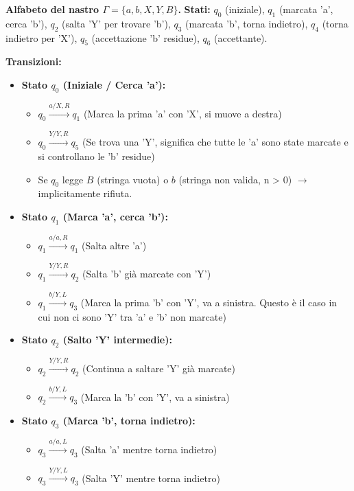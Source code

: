 \documentclass[a4paper, 11pt]{book} %
\theoremstyle{definition}
\begin{document}
\noindent \textbf{Alfabeto del nastro $\Gamma = \{a, b, X, Y, B\}$.}
\noindent \textbf{Stati:} $q_0$ (iniziale), $q_1$ (marcata 'a', cerca 'b'), $q_2$ (salta 'Y' per trovare 'b'), $q_3$ (marcata 'b', torna indietro), $q_4$ (torna indietro per 'X'), $q_5$ (accettazione 'b' residue), $q_6$ (accettante).

\noindent \textbf{Transizioni:}
\begin{itemize}
    \item \textbf{Stato $q_0$ (Iniziale / Cerca 'a'):}
        \begin{itemize}
            \item $q_0 \xrightarrow{a / X, R} q_1$ (Marca la prima 'a' con 'X', si muove a destra)
            \item $q_0 \xrightarrow{Y / Y, R} q_5$ (Se trova una 'Y', significa che tutte le 'a' sono state marcate e si controllano le 'b' residue)
            \item Se $q_0$ legge $B$ (stringa vuota) o $b$ (stringa non valida, n > 0) $\to$ implicitamente rifiuta.
        \end{itemize}
    \item \textbf{Stato $q_1$ (Marca 'a', cerca 'b'):}
        \begin{itemize}
            \item $q_1 \xrightarrow{a / a, R} q_1$ (Salta altre 'a')
            \item $q_1 \xrightarrow{Y / Y, R} q_2$ (Salta 'b' già marcate con 'Y')
            \item $q_1 \xrightarrow{b / Y, L} q_3$ (Marca la prima 'b' con 'Y', va a sinistra. Questo è il caso in cui non ci sono 'Y' tra 'a' e 'b' non marcate)
        \end{itemize}
    \item \textbf{Stato $q_2$ (Salto 'Y' intermedie):}
        \begin{itemize}
            \item $q_2 \xrightarrow{Y / Y, R} q_2$ (Continua a saltare 'Y' già marcate)
            \item $q_2 \xrightarrow{b / Y, L} q_3$ (Marca la 'b' con 'Y', va a sinistra)
        \end{itemize}
    \item \textbf{Stato $q_3$ (Marca 'b', torna indietro):}
        \begin{itemize}
            \item $q_3 \xrightarrow{a / a, L} q_3$ (Salta 'a' mentre torna indietro)
            \item $q_3 \xrightarrow{Y / Y, L} q_3$ (Salta 'Y' mentre torna indietro)

\end{itemize}
\end{itemize}
\end{document}
